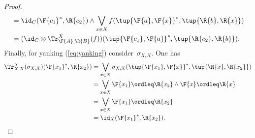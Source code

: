 \begin{proof}
\begin{equation}
\begin{aligned}
            &=\id_C(\F{c_1}^*,\R{c_2}) \wedge \bigvee_{x\in X} f(\tup{\F{a},\F{x}}^*,\tup{\R{b},\R{x}})\\
            &=(\id_C \otimes \Tr_{\F{A},\R{B}}^X(f))(\tup{\F{c_1},\F{a}}^*,\tup{\R{c_2},\R{b}}).
        \end{aligned}
    \end{equation}
    Finally, for yanking (\cref{eq:yanking}) consider~$\sigma_{X,X}$. One has
    \begin{equation}
        \begin{aligned}
            \Tr_{X,X}^{X}(\sigma_{X,X})(\F{x_1}^*,\R{x_2})&=\bigvee_{x\in X} \sigma_{X,X}(\tup{\F{x_1},\F{x}}^*,\tup{\R{x},\R{x_2}}) \\
            &=\bigvee_{x\in X} \F{x_1} \ordleq \R{x_2} \wedge \F{x}\ordleq \R{x}\\
            &=\bigvee_{x\in X} \F{x_1} \ordleq \R{x_2}\\
            &=\id_X(\F{x_1}^*,\R{x_2}).
        \end{aligned}
    \end{equation}
\end{proof}
